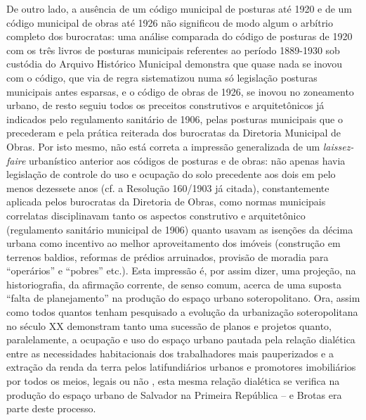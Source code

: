 De outro lado, a ausência de um código municipal de posturas até 1920 e de um código municipal de obras até 1926 não significou de modo algum o arbítrio completo dos burocratas: uma análise comparada do código de posturas de 1920 com os três livros de posturas municipais referentes ao período 1889-1930 sob custódia do Arquivo Histórico Municipal demonstra que quase nada se inovou com o código, que via de regra sistematizou numa só legislação posturas municipais antes esparsas, e o código de obras de 1926, se inovou no zoneamento urbano, de resto seguiu todos os preceitos construtivos e arquitetônicos já indicados pelo regulamento sanitário de 1906, pelas posturas municipais que o precederam e pela prática reiterada dos burocratas da Diretoria Municipal de Obras. Por isto mesmo, não está correta a impressão generalizada de um \textit{laissez-faire} urbanístico anterior aos códigos de posturas e de obras: não apenas havia legislação de controle do uso e ocupação do solo precedente aos dois em pelo menos dezessete anos (cf. a Resolução 160/1903 já citada), constantemente aplicada pelos burocratas da Diretoria de Obras, como normas municipais correlatas disciplinavam tanto os aspectos construtivo e arquitetônico (regulamento sanitário municipal de 1906) quanto usavam as isenções da décima urbana como incentivo ao melhor aproveitamento dos imóveis (construção em terrenos baldios, reformas de prédios arruinados, provisão de moradia para ``operários'' e ``pobres'' etc.). Esta impressão é, por assim dizer, uma projeção, na historiografia, da afirmação corrente, de senso comum, acerca de uma suposta ``falta de planejamento'' na produção do espaço urbano soteropolitano. Ora, assim como todos quantos tenham pesquisado a evolução da urbanização soteropolitana no século XX demonstram tanto uma sucessão de planos e projetos quanto, paralelamente, a ocupação e uso do espaço urbano pautada pela relação dialética entre as necessidades habitacionais dos trabalhadores mais pauperizados e a extração da renda da terra pelos latifundiários urbanos e promotores imobiliários por todos os meios, legais ou não \cite{BRANDAO1978, BRANDAO1978a, BRANDAO1980, CARVALHO1974, GORDILHO-SOUZA2008, SAMPAIO1999, VASCONCELLOS1974, VASCONCELOS2002}, esta mesma relação dialética se verifica na produção do espaço urbano de Salvador na Primeira República -- e Brotas era parte deste processo. 

